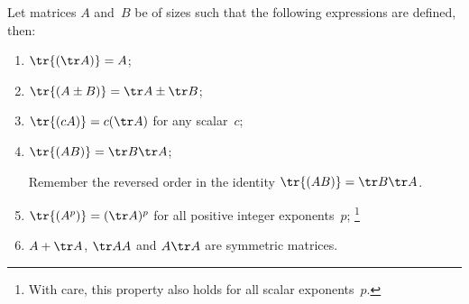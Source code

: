 \begin{theorem} \label{thm:pot}
Let matrices \(A\) and~\(B\) be of sizes such that the following expressions are defined, then:
\begin{enumerate}
\item\label{thm:pota} \(\tr{(\tr A)}=A\);
\item\label{thm:potb} \(\tr{(A\pm B)}=\tr A\pm \tr B\);
\item\label{thm:potc} \(\tr{(cA)}=c(\tr A)\) for any scalar~\(c\);
\item\label{thm:potd} \(\tr{(AB)}=\tr B\tr A\);
\begin{aside}
Remember the reversed order in the identity \(\tr{(AB)}=\tr B\tr A\).
\end{aside}
\item\label{thm:pote} \(\tr{(A^p)}=(\tr A)^p\) for all positive integer exponents~\(p\);
\footnote{With care, this property also holds for all scalar exponents~\(p\).}
\item\label{thm:potf} \(A+\tr A\),  \(\tr AA\) and \(A\tr A\) are symmetric matrices.
\end{enumerate}
\end{theorem}

